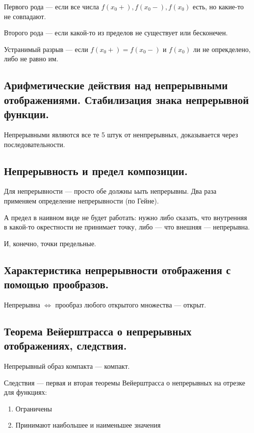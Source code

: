\documentclass[12pt, a4paper]{article}
\begin{document}
Первого рода — если все числа $f(x_0+), f(x_0-), f(x_0)$ есть, но какие-то не совпадают.

Второго рода — если какой-то из пределов не существует или бесконечен.

Устранимый разрыв — если $f(x_0+) = f(x_0-)$ и $f(x_0)$ ли не опрекделено, либо не равно им.


\subsection{Арифметические действия над непрерывными отображениями. Стабилизация знака непрерывной функции.}

Непрерывными являются все те 5 штук от ненпрерывных, доказывается через последовательности.

\subsection{Непрерывность и предел композиции.}

Для непрерывности — просто обе должны ьыть непрерывны. 
Два раза применяем определение непрерывности (по Гейне).

А предел в наивном виде не будет работать: 
нужно либо сказать, что внутренняя в какой-то окрестности не принимает точку, 
либо — что внешняя — непрерывна.

И, конечно, точки предельные.



\subsection{Характеристика непрерывности отображения с помощью прообразов.}

Непрерывна $\Leftrightarrow$ прообраз любого открытого множества — открыт.


\subsection{Теорема Вейерштрасса о непрерывных отображениях, следствия.}

Непрерывный образ компакта — компакт.

Следствия — первая и вторая теоремы Вейерштрасса о непрерывных на отрезке для функциях:

\begin{enumerate}
    \item Ограничены
    \item Принимают наибольшее и наименьшее значения
\end{enumerate}
\end{document}
